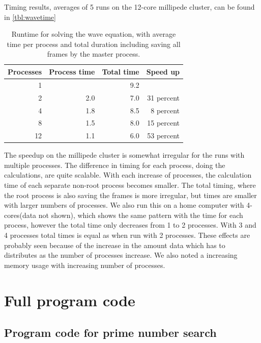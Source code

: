\documentclass[a4paper]{article}
\begin{document}
Timing results, averages of 5 runs on the 12-core millipede cluster, can be found in \autoref{tbl:wavetime}

\begin{table}[h]
	\centering
	\caption{Runtime for solving the wave equation, with average time per process and total duration including saving all frames by the master process.}
	\label{tbl:wavetime}
	\begin{tabular}{r|r|r|r}
		Processes & Process time & Total time & Speed up \\ \hline
		 1 & & 9.2 & \\
		 2 & 2.0 & 7.0 & 31 percent \\
		 4 & 1.8 & 8.5 & 8 percent \\
		 8 & 1.5 & 8.0 & 15 percent \\
		12 & 1.1 & 6.0 & 53 percent 
	\end{tabular}
\end{table}

The speedup on the millipede cluster is somewhat irregular for the runs with multiple processes. The difference in timing for each process, doing the calculations, are quite scalable. With each increase of processes, the calculation time of each separate non-root process becomes smaller. The total timing, where the root process is also saving the frames is more irregular, but times are smaller with larger numbers of processes. We also run this on a home computer with 4-cores(data not shown), which shows the same pattern with the time for each process, however the total time only decreases from 1 to 2 processes. With 3 and 4 processes total times is equal as when run with 2 processes. These effects are probably seen because of the increase in the amount data which has to distributes as the number of processes increase. We also noted a increasing memory usage with increasing number of processes.





\clearpage
\appendix
\section{Full program code}
\subsection{Program code for prime number search}


\end{document}
